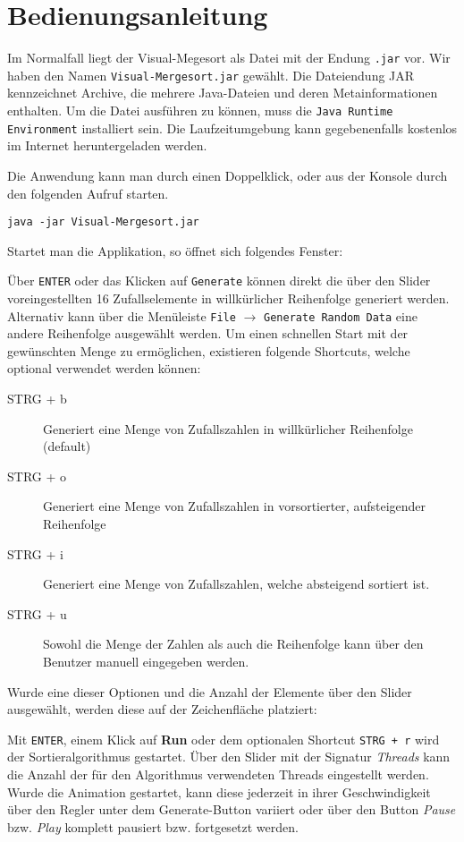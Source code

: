 \chapter{Bedienungsanleitung}\label{chap:bedienungsanleitung}

Im Normalfall liegt der Visual-Megesort als Datei mit der Endung \texttt{.jar} vor. Wir haben den Namen \texttt{Visual-Mergesort.jar} gewählt. Die Dateiendung JAR kennzeichnet Archive, die mehrere Java-Dateien und deren Metainformationen enthalten. Um die Datei ausführen zu können, muss die \texttt{Java Runtime Environment} installiert sein. Die Laufzeitumgebung kann gegebenenfalls kostenlos im Internet heruntergeladen werden.

Die Anwendung kann man durch einen Doppelklick, oder aus der Konsole durch den folgenden Aufruf starten.

\begin{verbatim}
java -jar Visual-Mergesort.jar
\end{verbatim}

Startet man die Applikation, so öffnet sich folgendes Fenster:


Über \texttt{ENTER} oder das Klicken auf \texttt{Generate} können direkt die über den Slider voreingestellten 16 Zufallselemente in willkürlicher Reihenfolge generiert werden. Alternativ kann über die Menüleiste \texttt{File} $\rightarrow$ \texttt{Generate Random Data} eine andere Reihenfolge ausgewählt werden. Um einen schnellen Start mit der gewünschten Menge zu ermöglichen, existieren folgende Shortcuts, welche optional verwendet werden können:

\begin{description}
\item[STRG + b] Generiert eine Menge von Zufallszahlen in willkürlicher Reihenfolge (default)

\item[STRG + o] Generiert eine Menge von Zufallszahlen in vorsortierter, aufsteigender Reihenfolge

\item[STRG + i] Generiert eine Menge von Zufallszahlen, welche absteigend sortiert ist.

\item[STRG + u] Sowohl die Menge der Zahlen als auch die Reihenfolge kann über den Benutzer manuell eingegeben werden.
\end{description}

Wurde eine dieser Optionen und die Anzahl der Elemente über den Slider ausgewählt, werden diese auf der Zeichenfläche platziert:



Mit \texttt{ENTER}, einem Klick auf \textbf{Run} oder dem optionalen Shortcut \texttt{STRG + r} wird der Sortieralgorithmus gestartet. Über den Slider mit der Signatur \textit{Threads} kann die Anzahl der für den Algorithmus verwendeten Threads eingestellt werden.\\
Wurde die Animation gestartet, kann diese jederzeit in ihrer Geschwindigkeit über den Regler unter dem Generate-Button variiert oder über den Button \textit{Pause} bzw. \textit{Play} komplett pausiert bzw. fortgesetzt werden.
